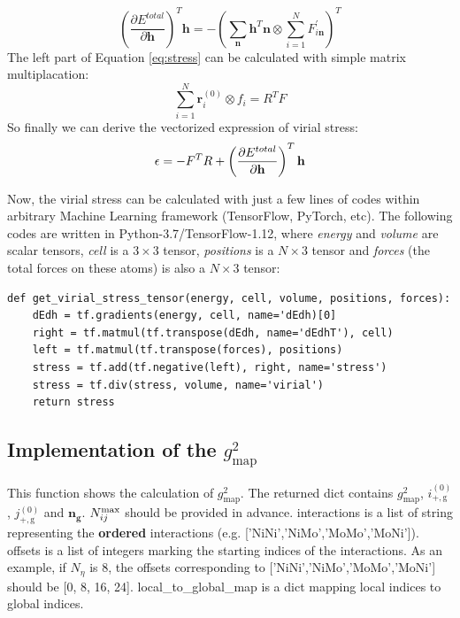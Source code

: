 \documentclass[prb,preprint]{revtex4-2}
\begin{document}
{\begin{equation}
\left(\frac{\partial E^{total}}{\partial \mathbf{h}}\right)^T \mathbf{h} =
-\left(\sum_{\mathbf{n}}{\mathbf{h}^T\mathbf{n}} \otimes 
\sum_{i=1}^{N}{F^{\prime}_{i\mathbf{n}}}\right)^T
\end{equation}
The left part of Equation \ref{eq:stress} can be calculated with 
simple matrix multiplacation:
\begin{equation}
\sum_{i=1}^{N}{\mathbf{r}_i^{(0)} \otimes f_i} = R^{T} F
\end{equation}
So finally we can derive the vectorized expression of virial stress:
\begin{equation}
\epsilon = -F^{T} R + \left( \frac{\partial{E^{total}}}{\partial \mathbf{h}} \right)^T\mathbf{h}
\end{equation}

Now, the virial stress can be calculated with just a few lines of codes within 
arbitrary Machine Learning framework (TensorFlow, PyTorch, etc). The following 
codes are written in Python-3.7/TensorFlow-1.12, where \textit{energy} and 
\textit{volume} are scalar tensors, \textit{cell} is a $3 \times 3$ tensor, 
\textit{positions} is a $N\times 3$ tensor and \textit{forces} (the total forces 
on these atoms) is also a $N\times 3$ tensor:
\begin{verbatim}
def get_virial_stress_tensor(energy, cell, volume, positions, forces):
    dEdh = tf.gradients(energy, cell, name='dEdh)[0]
    right = tf.matmul(tf.transpose(dEdh, name='dEdhT'), cell)
    left = tf.matmul(tf.transpose(forces), positions)
    stress = tf.add(tf.negative(left), right, name='stress')
    stress = tf.div(stress, volume, name='virial')
    return stress
\end{verbatim}

\newpage

\subsection{Implementation of the $g^2_{\mathrm{map}}$}

This function shows the calculation of $g^2_{\mathrm{map}}$. The returned dict
contains $g^2_{\mathrm{map}}$, $i^{(0)}_{\mathrm{+,g}}$, 
$j^{(0)}_{\mathrm{+,g}}$ and $\mathbf{n_g}$. $N_{ij}^{\mathrm{max}}$ should be provided in 
advance. \textmd{interactions} is a list of \textmd{string} representing the 
\textbf{ordered} interactions (e.g. \textmd{['NiNi','NiMo','MoMo','MoNi']}). 
\textmd{offsets} is a list of integers marking the starting indices of the 
\textmd{interactions}. As an example, if $N_{\eta}$ is 8, the \textmd{offsets}
corresponding to \textmd{['NiNi','NiMo','MoMo','MoNi']} should be 
\textmd{[0, 8, 16, 24]}.
\textmd{local\_to\_global\_map} is a dict mapping local indices to global 
indices.

}
\end{document}
